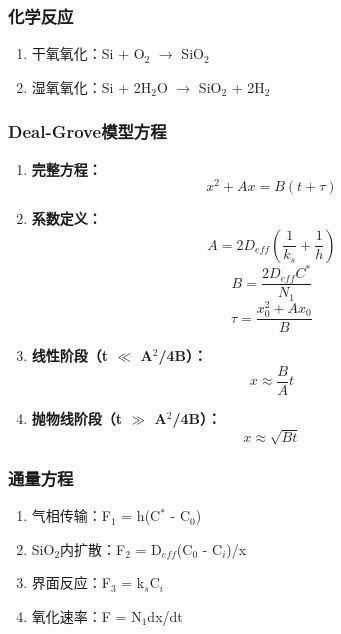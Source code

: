 \documentclass[UTF8,12pt,a4paper]{ctexart}
\begin{document}
\subsubsection{化学反应}

\begin{enumerate}
    \item 干氧氧化：Si + O$_2$ $\rightarrow$ SiO$_2$
    \item 湿氧氧化：Si + 2H$_2$O $\rightarrow$ SiO$_2$ + 2H$_2$
\end{enumerate}

\subsubsection{Deal-Grove模型方程}

\begin{enumerate}
    \item \textbf{完整方程：}
    \begin{equation*}
    x^2 + Ax = B(t + \tau)
    \end{equation*}
    
    \item \textbf{系数定义：}
    \begin{equation*}
    A = 2D_{eff}(\frac{1}{k_s} + \frac{1}{h})
    \end{equation*}
    \begin{equation*}
    B = \frac{2D_{eff}C^*}{N_1}
    \end{equation*}
    \begin{equation*}
    \tau = \frac{x_0^2 + Ax_0}{B}
    \end{equation*}
    
    \item \textbf{线性阶段（t $\ll$ A$^2$/4B）：}
    \begin{equation*}
    x \approx \frac{B}{A}t
    \end{equation*}
    
    \item \textbf{抛物线阶段（t $\gg$ A$^2$/4B）：}
    \begin{equation*}
    x \approx \sqrt{Bt}
    \end{equation*}
\end{enumerate}

\subsubsection{通量方程}

\begin{enumerate}
    \item 气相传输：F$_1$ = h(C$^*$ - C$_0$)
    \item SiO$_2$内扩散：F$_2$ = D$_{eff}$(C$_0$ - C$_i$)/x
    \item 界面反应：F$_3$ = k$_s$C$_i$
    \item 氧化速率：F = N$_1$dx/dt
\end{enumerate}
\end{document}
